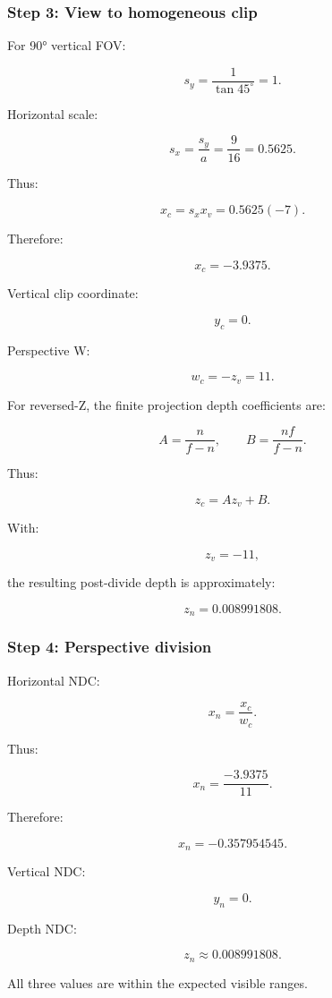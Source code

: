 \subsubsection{Step 3: View to homogeneous clip}\label{step-3-view-to-homogeneous-clip}

For 90° vertical FOV:

\[ s_y=\frac1{\tan45^\circ}=1. \]

Horizontal scale:

\[ s_x=\frac{s_y}{a}=\frac9{16}=0.5625. \]

Thus:

\[ x_c=s_xx_v=0.5625(-7). \]

Therefore:

\[ \boxed{x_c=-3.9375}. \]

Vertical clip coordinate:

\[ \boxed{y_c=0}. \]

Perspective W:

\[ \boxed{w_c=-z_v=11}. \]

For reversed-Z, the finite projection depth coefficients are:

\[ A=\frac n{f-n}, \qquad B=\frac{nf}{f-n}. \]

Thus:

\[ z_c=Az_v+B. \]

With:

\[ z_v=-11, \]

the resulting post-divide depth is approximately:

\[ \boxed{z_n=0.008991808}. \]

\subsubsection{Step 4: Perspective division}\label{step-4-perspective-division}

Horizontal NDC:

\[ x_n=\frac{x_c}{w_c}. \]

Thus:

\[ x_n=\frac{-3.9375}{11}. \]

Therefore:

\[ \boxed{ x_n=-0.357954545. } \]

Vertical NDC:

\[ \boxed{y_n=0}. \]

Depth NDC:

\[ \boxed{z_n\approx0.008991808}. \]

All three values are within the expected visible ranges.

